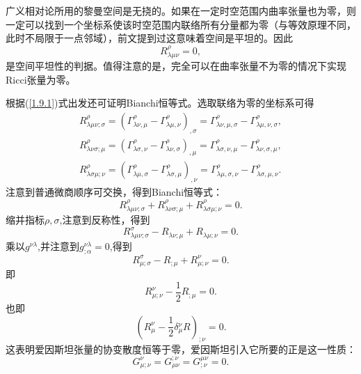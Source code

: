 \documentclass[11pt, a4paper, oneside, onecolumn]{ctexart}
\numberwithin{equation}{subsection}
\begin{document}
广义相对论所用的黎曼空间是无挠的。如果在一定时空范围内曲率张量也为零，则一定可以找到一个坐标系使该时空范围内联络所有分量都为零（与等效原理不同，此时不局限于一点邻域），前文提到过这意味着空间是平坦的。因此
\begin{equation}
R_{\lambda\mu\nu}^{\rho}=0,
\end{equation}
是空间平坦性的判据。值得注意的是，完全可以在曲率张量不为零的情况下实现Ricci张量为零。

根据(\ref{1.9.1})式出发还可证明Bianchi恒等式。选取联络为零的坐标系可得
\begin{align}
R^{\rho}_{\lambda\mu\nu;\sigma}=\left(\Gamma^{\rho}_{\lambda\nu,\mu}-\Gamma_{\lambda\mu,\nu}^{\rho}\right)_{,\sigma}=\Gamma^{\rho}_{\lambda\nu,\mu,\sigma}-\Gamma^{\rho}_{\lambda\mu,\nu,\sigma},\\
R^{\rho}_{\lambda\nu\sigma;\mu}=\left(\Gamma^{\rho}_{\lambda\sigma,\nu}-\Gamma_{\lambda\nu,\sigma}^{\rho}\right)_{,\mu}=\Gamma^{\rho}_{\lambda\sigma,\nu,\mu}-\Gamma^{\rho}_{\lambda\nu,\sigma,\mu},\\
R^{\rho}_{\lambda\sigma\mu;\nu}=\left(\Gamma^{\rho}_{\lambda\mu,\sigma}-\Gamma_{\lambda\sigma,\mu}^{\rho}\right)_{,\nu}=\Gamma^{\rho}_{\lambda\mu,\sigma,\nu}-\Gamma^{\rho}_{\lambda\sigma,\mu,\nu}.
\end{align}
注意到普通微商顺序可交换，得到Bianchi恒等式：
\begin{equation}
R^{\rho}_{\lambda\mu\nu;\sigma}+R^{\rho}_{\lambda\nu\sigma;\mu}+R^{\rho}_{\lambda\sigma\mu;\nu}=0.
\end{equation}
缩并指标$\rho,\sigma$,注意到反称性，得到
\begin{equation}
R^{\sigma}_{\lambda\mu\nu;\sigma}-R_{\lambda\nu;\mu}+R_{\lambda\mu;\nu}=0.
\end{equation}
乘以$g^{\nu\lambda}$,并注意到$g^{\nu\lambda}_{;\alpha}=0$,得到
\begin{equation}
R^{\sigma}_{\mu;\sigma}-R_{;\mu}+R^{\nu}_{\mu;\nu}=0.
\end{equation}
即
\begin{equation}
R^{\nu}_{\mu;\nu}-\frac12R_{;\mu}=0.
\end{equation}
也即
\begin{equation}
\left(R^{\nu}_{\mu}-\frac12\delta{}_{\mu}^{\nu}R\right)_{;\nu}=0.
\end{equation}
这表明爱因斯坦张量的协变散度恒等于零，爱因斯坦引入它所要的正是这一性质：
\begin{equation}
G_{\mu;\nu}^{\nu}=G_{\mu\nu}^{;\nu}=G^{\mu\nu}_{;\nu}=0.
\end{equation}
\end{document}
